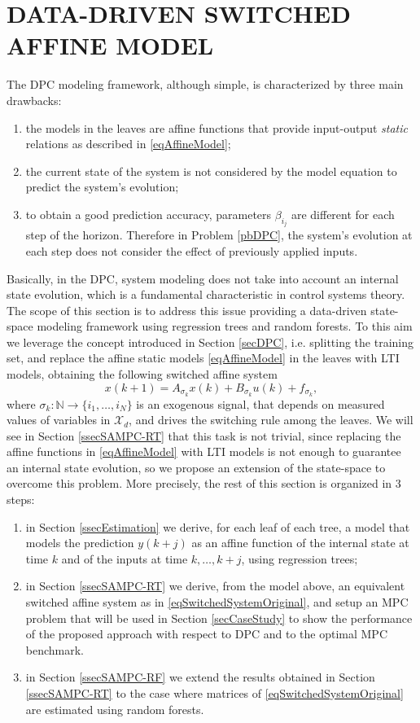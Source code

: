 \documentclass[]{ifacconf}  %
\begin{document}
\section{DATA-DRIVEN SWITCHED AFFINE MODEL}\label{secDataDrivenModeling}
The DPC modeling framework, although simple, is characterized by three main drawbacks:
\begin{enumerate}
\item the models in the leaves are affine functions that provide input-output \emph{static} relations as described in \eqref{eqAffineModel};
\item the current state of the system is not considered by the model equation to predict the system's evolution;
\item to obtain a good prediction accuracy, parameters $\beta_{i_j}$ are different for each step of the horizon.
Therefore in Problem \ref{pbDPC}, the system's evolution at each step does not consider the effect of previously applied inputs.
\end{enumerate}
Basically, in the DPC, system modeling does not take into account an internal state evolution, which is a fundamental characteristic in control systems theory.
The scope of this section is to address this issue providing a data-driven state-space modeling framework using regression trees and random forests.
To this aim we leverage the concept introduced in Section \ref{secDPC}, i.e. splitting the training set, and replace the affine static models \eqref{eqAffineModel} in the leaves with LTI models, obtaining the following switched affine system
\small
\begin{equation}\label{eqSwitchedSystemOriginal}
x(k+1) = A_{\sigma_k}x(k) + B_{\sigma_k}u(k) + f_{\sigma_k},
\end{equation}
\normalsize
\noindent where $\sigma_k: \mathbb{N} \rightarrow \{i_1,\ldots,i_N\}$ is an exogenous signal, that depends on measured values of variables in $\mathcal{X}_d$, and drives the switching rule among the leaves.
We will see in Section \ref{ssecSAMPC-RT} that this task is not trivial, since replacing the affine functions in \eqref{eqAffineModel} with LTI models is not enough to guarantee an internal state evolution, so we propose an extension of the state-space to overcome this problem.
More precisely, the rest of this section is organized in 3 steps:
\begin{enumerate}
	\item in Section \ref{ssecEstimation} we derive, for each leaf of each tree, a model that models the prediction $y(k+j)$ as an affine function of the internal state at time $k$ and of the inputs at time $k,\ldots,k+j$, using regression trees;
	\item in Section \ref{ssecSAMPC-RT} we derive, from the model above, an equivalent switched affine system as in \eqref{eqSwitchedSystemOriginal}, and setup an MPC problem that will be used in Section \ref{secCaseStudy} to show the performance of the proposed approach with respect to DPC and to the optimal MPC benchmark.
	\item in Section \ref{ssecSAMPC-RF} we extend the results obtained in Section \ref{ssecSAMPC-RT} to the case where matrices of \eqref{eqSwitchedSystemOriginal} are estimated using random forests.
\end{enumerate}
\end{document}
